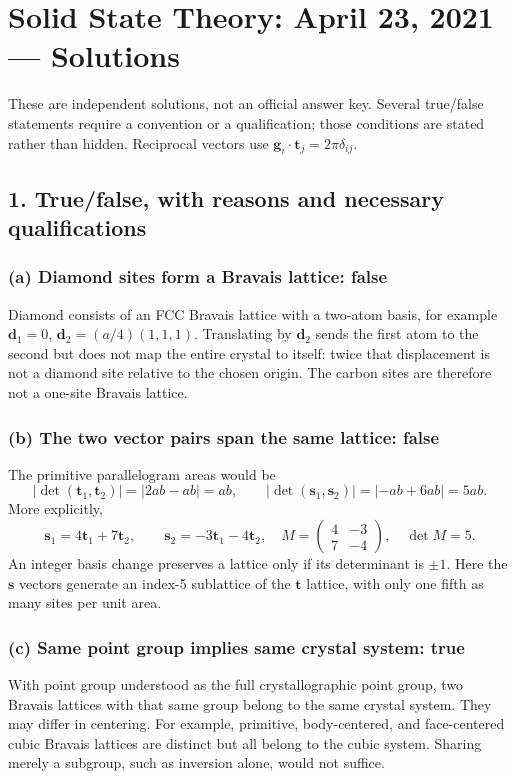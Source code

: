 \chapter{Solid State Theory: April 23, 2021 --- Solutions}
\label{s:theory-2021-04-midterm}
\begin{sourceNote}
These are independent solutions, not an official answer key. Several true/false statements require a convention or a qualification; those conditions are stated rather than hidden. Reciprocal vectors use $\mathbf g_i\cdot\mathbf t_j=2\pi\delta_{ij}$.
\end{sourceNote}

\section*{1. True/false, with reasons and necessary qualifications}
\subsection*{(a) Diamond sites form a Bravais lattice: false}
Diamond consists of an FCC Bravais lattice with a two-atom basis, for example $\mathbf d_1=0$, $\mathbf d_2=(a/4)(1,1,1)$. Translating by $\mathbf d_2$ sends the first atom to the second but does not map the entire crystal to itself: twice that displacement is not a diamond site relative to the chosen origin. The carbon sites are therefore not a one-site Bravais lattice.

\subsection*{(b) The two vector pairs span the same lattice: false}
The primitive parallelogram areas would be
\[
|\det(\mathbf t_1,\mathbf t_2)|=|2ab-ab|=ab,\qquad
|\det(\mathbf s_1,\mathbf s_2)|=|-ab+6ab|=5ab.
\]
More explicitly,
\[
\mathbf s_1=4\mathbf t_1+7\mathbf t_2,\qquad
\mathbf s_2=-3\mathbf t_1-4\mathbf t_2,
\quad
M=\begin{pmatrix}4&-3\\7&-4\end{pmatrix},\quad\det M=5.
\]
An integer basis change preserves a lattice only if its determinant is $\pm1$. Here the $\mathbf s$ vectors generate an index-5 sublattice of the $\mathbf t$ lattice, with only one fifth as many sites per unit area.

\subsection*{(c) Same point group implies same crystal system: true}
With point group understood as the full crystallographic point group, two Bravais lattices with that same group belong to the same crystal system. They may differ in centering. For example, primitive, body-centered, and face-centered cubic Bravais lattices are distinct but all belong to the cubic system. Sharing merely a subgroup, such as inversion alone, would not suffice.

